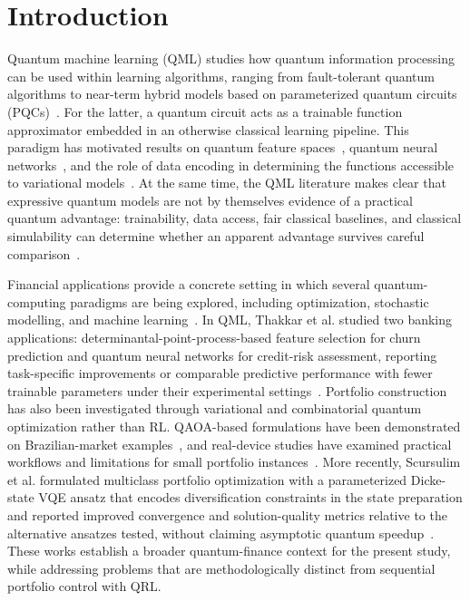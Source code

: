 \documentclass[aps,floatfix,superscriptaddress,twocolumn,tightenlines,amsmath,amssymb,nofootinbib,10pt,longbibliography,prl]{revtex4-2}
\begin{document}
\section{Introduction}
\label{sec:introduction}

Quantum machine learning (QML) studies how quantum information processing can be used within learning algorithms, ranging from fault-tolerant quantum algorithms to near-term hybrid models based on parameterized quantum circuits (PQCs)~\cite{Biamonte2017Quantummachinelear, Benedetti2019Parameterizedquant, Cerezo2021Variationalquantum}. For the latter, a quantum circuit acts as a trainable function approximator embedded in an otherwise classical learning pipeline. This paradigm has motivated results on quantum feature spaces~\cite{Schuld2019QuantumMachineLear,Havlek2019Supervisedlearning}, quantum neural networks~\cite{Abbas2021Thepowerofquantumn}, and the role of data encoding in determining the functions accessible to variational models~\cite{Schuld2021Effectofdataencodi}. At the same time, the QML literature makes clear that expressive quantum models are not by themselves evidence of a practical quantum advantage: trainability, data access, fair classical baselines, and classical simulability can determine whether an apparent advantage survives careful comparison~\cite{Huang2021Powerofdatainquant,Tang2022Dequantizingalgori,McClean2018Barrenplateausinqu}.

Financial applications provide a concrete setting in which several quantum-computing paradigms are being explored, including optimization, stochastic modelling, and machine learning~\cite{Orus2019QuantumFinance,Herman2023QuantumFinance}. In QML, Thakkar et al. studied two banking applications: determinantal-point-process-based feature selection for churn prediction and quantum neural networks for credit-risk assessment, reporting task-specific improvements or comparable predictive performance with fewer trainable parameters under their experimental settings~\cite{Thakkar2024FinancialForecasting}. Portfolio construction has also been investigated through variational and combinatorial quantum optimization rather than RL. QAOA-based formulations have been demonstrated on Brazilian-market examples~\cite{Canabarro2022QuantumFinance}, and real-device studies have examined practical workflows and limitations for small portfolio instances~\cite{Buonaiuto2023Portfolio}. More recently, Scursulim et al. formulated multiclass portfolio optimization with a parameterized Dicke-state VQE ansatz that encodes diversification constraints in the state preparation and reported improved convergence and solution-quality metrics relative to the alternative ansatzes tested, without claiming asymptotic quantum speedup~\cite{Scursulim2026MulticlassPortfolio}. These works establish a broader quantum-finance context for the present study, while addressing problems that are methodologically distinct from sequential portfolio control with QRL.
\end{document}

